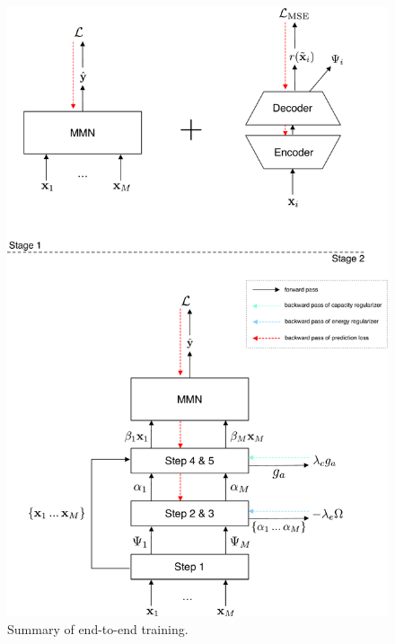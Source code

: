 \null
\vfill
\begin{center}
\begin{figure}[!h]
\centering
\includegraphics[scale=0.5]{figures/summary-training}
\caption{Summary of end-to-end training.}	
\label{fig:training}
\end{figure}
\end{center}
\vfill
\clearpage